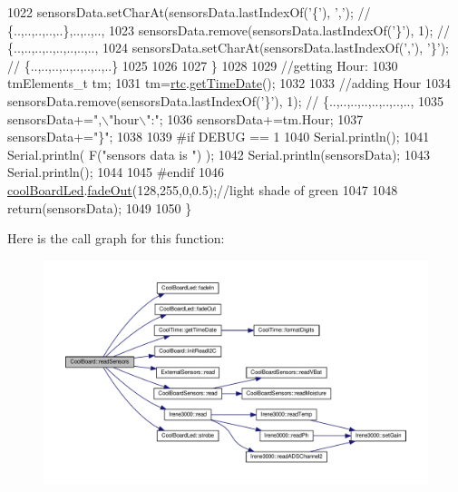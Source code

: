 \begin{DoxyCode}
1022         sensorsData.setCharAt(sensorsData.lastIndexOf(\textcolor{charliteral}{'\{'}), \textcolor{charliteral}{','}); \textcolor{comment}{// \{..,..,..,..,..\},..,..,..,}
1023         sensorsData.remove(sensorsData.lastIndexOf(\textcolor{charliteral}{'\}'}), 1); \textcolor{comment}{// \{..,..,..,..,..,..,..,..,}
1024         sensorsData.setCharAt(sensorsData.lastIndexOf(\textcolor{charliteral}{','}), \textcolor{charliteral}{'\}'}); \textcolor{comment}{// \{..,..,..,..,..,..,..,..\}      }
1025         
1026         
1027     \}
1028 
1029     \textcolor{comment}{//getting Hour:}
1030     tmElements\_t tm;
1031     tm=\hyperlink{classCoolBoard_a50d2a6716879d64a85f3c6b44ad63275}{rtc}.\hyperlink{classCoolTime_a7a7501c5ca77dd1248bea704c44f986c}{getTimeDate}();
1032     
1033     \textcolor{comment}{//adding Hour}
1034     sensorsData.remove(sensorsData.lastIndexOf(\textcolor{charliteral}{'\}'}), 1); \textcolor{comment}{// \{..,..,..,..,..,..,..,..,   }
1035     sensorsData+=\textcolor{stringliteral}{",\(\backslash\)"hour\(\backslash\)":"};  
1036     sensorsData+=tm.Hour;
1037     sensorsData+=\textcolor{stringliteral}{"\}"};
1038     
1039 \textcolor{preprocessor}{#if DEBUG == 1}
1040     Serial.println();
1041     Serial.println( F(\textcolor{stringliteral}{"sensors data is "}) );
1042     Serial.println(sensorsData);
1043     Serial.println();
1044 
1045 \textcolor{preprocessor}{#endif}
1046     \hyperlink{classCoolBoard_a1b1d3c684a5baa56b08486e192fd8e97}{coolBoardLed}.\hyperlink{classCoolBoardLed_a93d545679237e8cc858324367149775c}{fadeOut}(128,255,0,0.5);\textcolor{comment}{//light shade of green}
1047 
1048     \textcolor{keywordflow}{return}(sensorsData);
1049 
1050 \}
\end{DoxyCode}
Here is the call graph for this function\+:
\nopagebreak
\begin{figure}[H]
\begin{center}
\leavevmode
\includegraphics[width=350pt]{classCoolBoard_ad03abdce2e65f520bbf2cff0f2d083cf_cgraph}
\end{center}
\end{figure}
